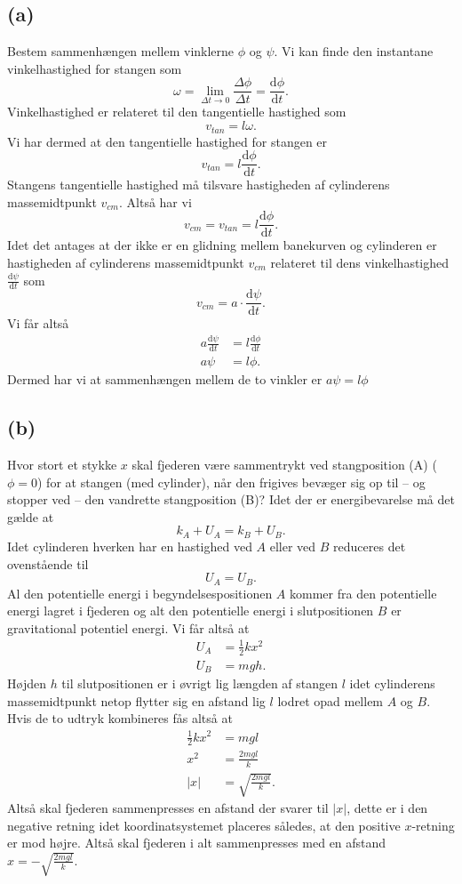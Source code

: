 \documentclass[12pt]{article}
\theoremstyle{definition}
\begin{document}
\subsection*{(a)}
Bestem sammenhængen mellem vinklerne $\phi$ og $\psi$.
\bigbreak
Vi kan finde den instantane vinkelhastighed for stangen som
\[ 
\omega = \lim_{\Delta t \to 0} \frac{\Delta \phi}{\Delta t} = \frac{\mathrm{d}\phi}{\mathrm{d}t} 
.\]
Vinkelhastighed er relateret til den tangentielle hastighed som
\[ 
v_{tan} = l\omega
.\]
Vi har dermed at den tangentielle hastighed for stangen er
\[ 
v_{tan} = l \frac{\mathrm{d}\phi}{\mathrm{d}t} 
.\]
Stangens tangentielle hastighed må tilsvare hastigheden af cylinderens massemidtpunkt $v_{cm}$. Altså har vi
\[ 
v_{cm} = v_{tan} = l \frac{\mathrm{d}\phi}{\mathrm{d}t} 
.\]
Idet det antages at der ikke er en glidning mellem banekurven og cylinderen er hastigheden af cylinderens massemidtpunkt $v_{cm}$ relateret til dens vinkelhastighed $\frac{\mathrm{d}\psi}{\mathrm{d}t}$ som
\[ 
v_{cm} = a \cdot \frac{\mathrm{d}\psi}{\mathrm{d}t} 
.\]
Vi får altså
\begin{align*}
  a \frac{\mathrm{d}\psi}{\mathrm{d}t} &= l \frac{\mathrm{d}\phi}{\mathrm{d}t}  \\
  a \psi &= l \phi
.\end{align*}
Dermed har vi at sammenhængen mellem de to vinkler er \underline{\underline{$a\psi = l\phi$}}


\subsection*{(b)}
Hvor stort et stykke $x$ skal fjederen være sammentrykt ved stangposition (A) ($\phi = 0$) for at stangen (med cylinder), når den frigives bevæger sig op til -- og stopper ved -- den vandrette stangposition (B)?
\bigbreak
Idet der er energibevarelse må det gælde at
\[ 
k_{A} + U_{A} = k_{B} + U_{B}
.\]
Idet cylinderen hverken har en hastighed ved $A$ eller ved $B$ reduceres det ovenstående til
\[ 
U_{A} = U_B
.\]
Al den potentielle energi i begyndelsespositionen $A$ kommer fra den potentielle energi lagret i fjederen og alt den potentielle energi i slutpositionen $B$ er gravitational potentiel energi. Vi får altså at
\begin{align*}
  U_{A} &= \frac{1}{2}kx^2 \\
  U_{B} &= mgh
.\end{align*}
Højden $h$ til slutpositionen er i øvrigt lig længden af stangen $l$ idet cylinderens massemidtpunkt netop flytter sig en afstand lig $l$ lodret opad mellem $A$ og $B$. Hvis de to udtryk kombineres fås altså at
\begin{align*}
  \frac{1}{2}kx^2 &= mgl \\
  x^2 &= \frac{2mgl}{k} \\
  |x| &= \sqrt{\frac{2mgl}{k}}
.\end{align*}
Altså skal fjederen sammenpresses en afstand der svarer til $|x|$, dette er i den negative retning idet koordinatsystemet placeres således, at den positive $x$-retning er mod højre. Altså skal fjederen i alt sammenpresses med en afstand \underline{\underline{$x = -\sqrt{\frac{2mgl}{k}}$}}.
\end{document}
